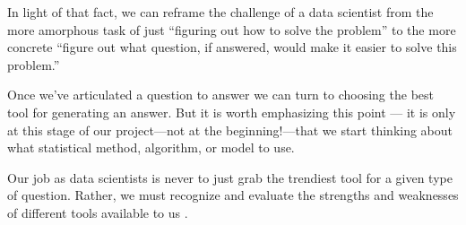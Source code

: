 \documentclass[letterpaper,10pt,english]{jupyterBook}
\begin{document}
\sphinxAtStartPar
In light of that fact, we can reframe the challenge of a data scientist from the more amorphous task of just “figuring out how to solve the problem” to the more concrete “figure out what question, if answered, would make it easier to solve this problem.”



\sphinxAtStartPar
Once we’ve articulated a question to answer we can turn to choosing the best tool for generating an answer. But it is worth emphasizing this point — it is only at this stage of our project—not at the beginning!—that we start thinking about what statistical method, algorithm, or model to use.

\sphinxAtStartPar
Our job as data scientists is never to just grab the trendiest tool for a given type of question. Rather, we must recognize and evaluate the strengths and weaknesses of different tools available to us .
\end{document}
